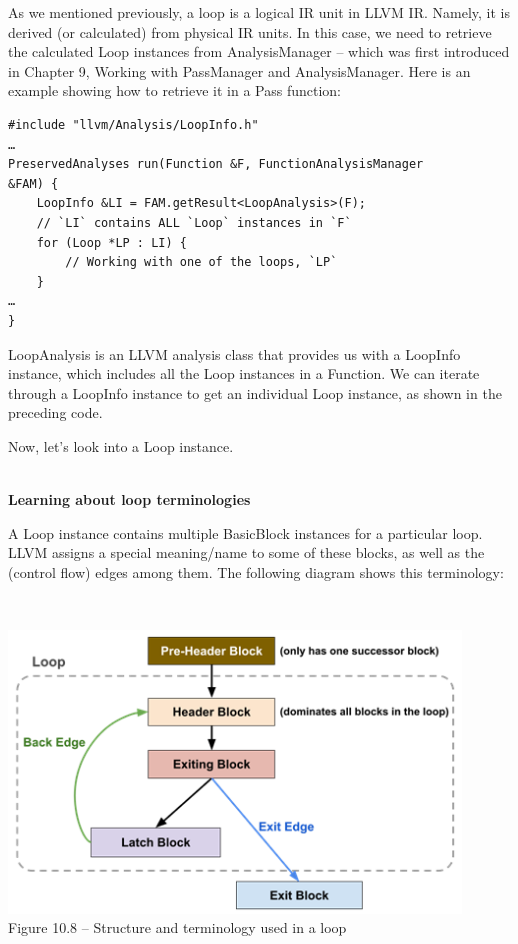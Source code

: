 As we mentioned previously, a loop is a logical IR unit in LLVM IR. Namely, it is derived (or calculated) from physical IR units. In this case, we need to retrieve the calculated Loop instances from AnalysisManager – which was first introduced in Chapter 9, Working with PassManager and AnalysisManager. Here is an example showing how to retrieve it in a Pass function:

\begin{lstlisting}[style=styleCXX]
#include "llvm/Analysis/LoopInfo.h"
…
PreservedAnalyses run(Function &F, FunctionAnalysisManager
&FAM) {
	LoopInfo &LI = FAM.getResult<LoopAnalysis>(F);
	// `LI` contains ALL `Loop` instances in `F`
	for (Loop *LP : LI) {
		// Working with one of the loops, `LP`
	}
…
}
\end{lstlisting}

LoopAnalysis is an LLVM analysis class that provides us with a LoopInfo instance, which includes all the Loop instances in a Function. We can iterate through a LoopInfo instance to get an individual Loop instance, as shown in the preceding code.

Now, let's look into a Loop instance.

\hspace*{\fill} \\ %
\noindent
\textbf{Learning about loop terminologies}

A Loop instance contains multiple BasicBlock instances for a particular loop. LLVM assigns a special meaning/name to some of these blocks, as well as the (control flow) edges among them. The following diagram shows this terminology:

\hspace*{\fill} \\ %
\begin{center}
\includegraphics[width=0.9\textwidth]{content/3/chapter10/images/8.png}\\
Figure 10.8 – Structure and terminology used in a loop
\end{center}

